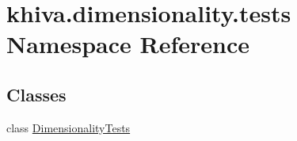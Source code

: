 \hypertarget{namespacekhiva_1_1dimensionality_1_1tests}{}\section{khiva.\+dimensionality.\+tests Namespace Reference}
\label{namespacekhiva_1_1dimensionality_1_1tests}
\subsection*{Classes}
\begin{DoxyCompactItemize}
\item 
class \mbox{\hyperlink{classkhiva_1_1dimensionality_1_1tests_1_1_dimensionality_tests}{Dimensionality\+Tests}}
\end{DoxyCompactItemize}
